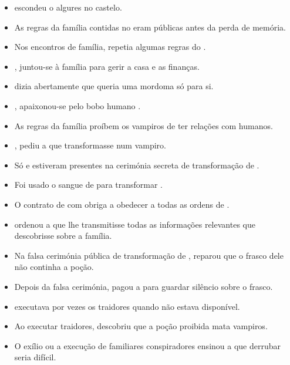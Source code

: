 \begin{itemize}
  \item {} escondeu o  algures no castelo.
  \item As regras da família contidas no  eram públicas antes da perda de memória.
  \item Nos encontros de família,  repetia algumas regras do .
  \item {},  juntou-se à família para gerir a casa e as finanças.
  \item {} dizia abertamente que queria uma mordoma só para si.
  \item {},  apaixonou-se pelo bobo humano .
  \item As regras da família proíbem os vampiros de ter relações com humanos.
  \item {},  pediu a  que transformasse  num vampiro.
  \item Só  e  estiveram presentes na cerimónia secreta de transformação de .
  \item Foi usado o sangue de  para transformar .
  \item O contrato de  com  obriga  a obedecer a todas as ordens de .
  \item {} ordenou a  que lhe transmitisse todas as informações relevantes que descobrisse sobre a família.
  \item Na falsa cerimónia pública de transformação de ,  reparou que o frasco dele não continha a poção.
  \item Depois da falsa cerimónia,  pagou a  para guardar silêncio sobre o frasco.
  \item {} executava por vezes os traidores quando  não estava disponível.
  \item Ao executar traidores,  descobriu que a poção proibida mata vampiros.
  \item O exílio ou a execução de familiares conspiradores ensinou a  que derrubar  seria difícil.

\end{itemize}
